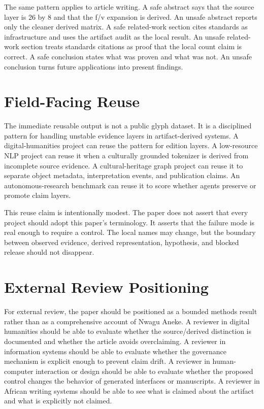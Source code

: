 \documentclass[sigconf,nonacm]{acmart}
\begin{document}
The same pattern applies to article writing. A safe abstract says that the
source layer is 26 by 8 and that the f/v expansion is derived. An unsafe abstract
reports only the cleaner derived matrix. A safe related-work section cites
standards as infrastructure and uses the artifact audit as the local result. An
unsafe related-work section treats standards citations as proof that the local
count claim is correct. A safe conclusion states what was proven and what was
not. An unsafe conclusion turns future applications into present findings.

\section{Field-Facing Reuse}
The immediate reusable output is not a public glyph dataset. It is a disciplined
pattern for handling unstable evidence layers in artifact-derived systems. A
digital-humanities project can reuse the pattern for edition layers. A
low-resource NLP project can reuse it when a culturally grounded tokenizer is
derived from incomplete source evidence. A cultural-heritage graph project can
reuse it to separate object metadata, interpretation events, and publication
claims. An autonomous-research benchmark can reuse it to score whether agents
preserve or promote claim layers.

This reuse claim is intentionally modest. The paper does not assert that every
project should adopt this paper's terminology. It asserts that the failure mode is
real enough to require a control. The local names may change, but the boundary
between observed evidence, derived representation, hypothesis, and blocked
release should not disappear.

\section{External Review Positioning}
For external review, the paper should be positioned as a bounded methods result
rather than as a comprehensive account of Nwagu Aneke. A reviewer in digital
humanities should be able to evaluate whether the source/derived distinction is
documented and whether the article avoids overclaiming. A reviewer in
information systems should be able to evaluate whether the governance mechanism
is explicit enough to prevent claim drift. A reviewer in human-computer
interaction or design should be able to evaluate whether the proposed control
changes the behavior of generated interfaces or manuscripts. A reviewer in
African writing systems should be able to see what is claimed about the artifact
and what is explicitly not claimed.
\end{document}
